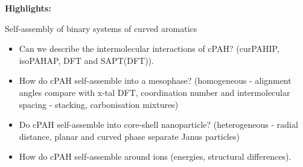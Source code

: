 \documentclass[como,a4paper,12pt,final]{Classes/c4e-preprint}
\begin{document}
\textbf{Highlights:}

Self-assembly of binary systems of curved aromatics
\begin{itemize}
\item Can we describe the intermolecular interactions of cPAH? (curPAHIP, isoPAHAP, DFT and SAPT(DFT)).
\item How do cPAH self-assemble into a mesophase? (homogeneous - alignment angles compare with x-tal DFT, coordination number and intermolecular spacing - stacking, carbonisation mixtures)
\item Do cPAH self-assemble into core-shell nanoparticle? (heterogeneous - radial distance, planar and curved phase separate Janus particles)
\item How do cPAH self-assemble around ions (energies, structural differences).
\end{itemize}

\vfill

\clearpage \setcounter{tocdepth}{3} \tableofcontents

\clearpage


\clearpage \appendix
{}


\clearpage \citeindexfalse

\end{document}
